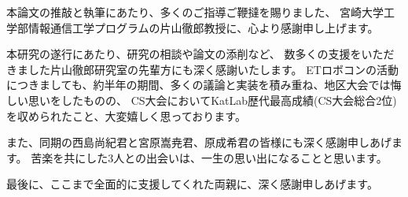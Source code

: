 \acknowledgment

本論文の推敲と執筆にあたり、多くのご指導ご鞭撻を賜りました、
宮崎大学工学部情報通信工学プログラムの片山徹郎教授に、心より感謝申し上げます。

本研究の遂行にあたり、研究の相談や論文の添削など、
数多くの支援をいただきました片山徹郎研究室の先輩方にも深く感謝いたします。
ETロボコンの活動につきましても、約半年の期間、多くの議論と実装を積み重ね、地区大会では悔しい思いをしたものの、
CS大会においてKatLab歴代最高成績(CS大会総合2位)を収められたこと、大変嬉しく思っております。

また、同期の西島尚紀君と宮原嵩尭君、原成希君の皆様にも深く感謝申しあげます。
苦楽を共にした3人との出会いは、一生の思い出になることと思います。

最後に、ここまで全面的に支援してくれた両親に、深く感謝申しあげます。